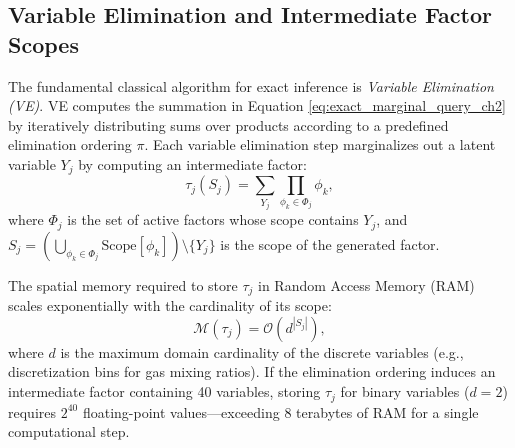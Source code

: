 \subsection{Variable Elimination and Intermediate Factor Scopes}
The fundamental classical algorithm for exact inference is \emph{Variable Elimination (VE)}. VE computes the summation in Equation \eqref{eq:exact_marginal_query_ch2} by iteratively distributing sums over products according to a predefined elimination ordering $\pi$. Each variable elimination step marginalizes out a latent variable $Y_j$ by computing an intermediate factor:
\begin{equation}
\tau_j(S_j) = \sum_{Y_j} \prod_{\phi_k \in \Phi_j} \phi_k,
\label{eq:ve_intermediate_factor}
\end{equation}
where $\Phi_j$ is the set of active factors whose scope contains $Y_j$, and $S_j = \left(\bigcup_{\phi_k \in \Phi_j} \mathrm{Scope}[\phi_k]\right) \setminus \{Y_j\}$ is the scope of the generated factor. 

The spatial memory required to store $\tau_j$ in Random Access Memory (RAM) scales exponentially with the cardinality of its scope:
\begin{equation}
\mathcal{M}(\tau_j) = \mathcal{O}\left(d^{|S_j|}\right),
\label{eq:factor_memory_scaling}
\end{equation}
where $d$ is the maximum domain cardinality of the discrete variables (e.g., discretization bins for gas mixing ratios). If the elimination ordering induces an intermediate factor containing 40 variables, storing $\tau_j$ for binary variables ($d=2$) requires $2^{40}$ floating-point values---exceeding 8 terabytes of RAM for a single computational step.

